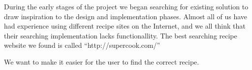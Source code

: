 During the early stages of the project we began searching for existing solution to draw inspiration to the design and implementation phases. Almost all of us have had experience using different recipe sites on the Internet, and we all think that their searching implementation lacks functionallity. The best searching recipe website we found is called ``http://supercook.com/''\cite{supercook}



We want to make it easier for the user to find the correct recipe.


